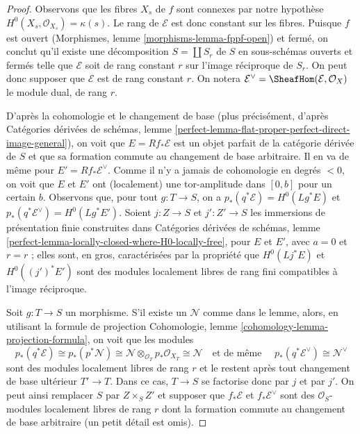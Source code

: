 \begin{proof}
Observons que les fibres $X_s$ de $f$ sont connexes par notre hypothèse
$H^0(X_s, \mathcal{O}_{X_s}) = \kappa(s)$. Le rang de
$\mathcal{E}$ est donc constant sur les fibres. Puisque $f$ est ouvert
(Morphismes, lemme \ref{morphisms-lemma-fppf-open}) et fermé,
on conclut qu'il existe une décomposition $S = \coprod S_r$
de $S$ en sous-schémas ouverts et fermés telle que $\mathcal{E}$
soit de rang constant $r$ sur l'image réciproque de $S_r$.
On peut donc supposer que $\mathcal{E}$ est de rang constant $r$.
On notera $\mathcal{E}^\vee = \SheafHom(\mathcal{E}, \mathcal{O}_X)$
le module dual, de rang $r$.

\medskip\noindent
D'après la cohomologie et le changement de base (plus précisément, d'après
Catégories dérivées de schémas, lemme
\ref{perfect-lemma-flat-proper-perfect-direct-image-general}),
on voit que $E = Rf_*\mathcal{E}$ est un objet parfait de la
catégorie dérivée de $S$ et que sa formation commute au
changement de base arbitraire. Il en va de même pour $E' = Rf_*\mathcal{E}^\vee$.
Comme il n'y a jamais de cohomologie en degrés $< 0$, on voit que
$E$ et $E'$ ont (localement) une tor-amplitude dans $[0, b]$ pour un certain $b$.
Observons que, pour tout $g : T \to S$, on a
$p_*(q^*\mathcal{E}) = H^0(Lg^*E)$ et
$p_*(q^*\mathcal{E}^\vee) = H^0(Lg^*E')$.
Soient $j : Z \to S$ et $j' : Z' \to S$ les immersions
de présentation finie construites dans Catégories dérivées de schémas, lemme
\ref{perfect-lemma-locally-closed-where-H0-locally-free},
pour $E$ et $E'$, avec $a = 0$ et $r = r$ ; elles sont, en gros,
caractérisées par la propriété que $H^0(Lj^*E)$ et $H^0((j')^*E')$
sont des modules localement libres de rang fini compatibles à l'image réciproque.

\medskip\noindent
Soit $g : T \to S$ un morphisme. S'il existe un $\mathcal{N}$
comme dans le lemme, alors, en utilisant la formule de projection
Cohomologie, lemme \ref{cohomology-lemma-projection-formula},
on voit que les modules
$$
p_*(q^*\mathcal{E}) \cong
p_*(p^*\mathcal{N}) \cong
\mathcal{N} \otimes_{\mathcal{O}_T} p_*\mathcal{O}_{X_T} \cong
\mathcal{N}\quad\text{et de même }\quad
p_*(q^*\mathcal{E}^\vee) \cong \mathcal{N}^\vee
$$
sont des modules localement libres de rang $r$
et le restent après tout changement de base ultérieur $T' \to T$.
Dans ce cas, $T \to S$ se factorise donc par $j$ et par $j'$.
On peut ainsi remplacer $S$ par $Z \times_S Z'$ et supposer que
$f_*\mathcal{E}$ et $f_*\mathcal{E}^\vee$ sont des
$\mathcal{O}_S$-modules localement libres de rang $r$
dont la formation commute au changement de base arbitraire
(un petit détail est omis).


\end{proof}
